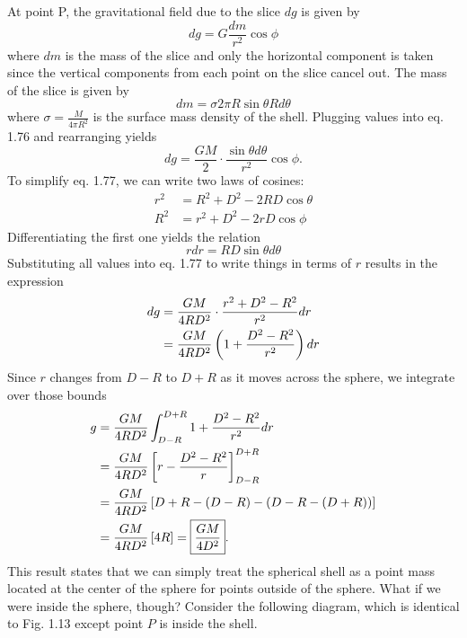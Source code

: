 \noindent At point P, the gravitational field due to the slice $dg$ is given by 
\begin{equation}
    dg = G\frac{dm}{r^2} \cos\phi
\end{equation}
\noindent where $dm$ is the mass of the slice and only the horizontal component is taken since the vertical components from each point on the slice cancel out. The mass of the slice is given by 
\begin{equation*}
    dm = \sigma 2\pi R\sin\theta Rd\theta
\end{equation*}
\noindent where $\sigma = \frac{M}{4\pi R^2}$ is the surface mass density of the shell. Plugging values into eq. 1.76 and rearranging yields
\begin{equation}
    dg = \frac{GM}{2}\cdot\frac{\sin\theta d\theta}{r^2}\cos\phi.
\end{equation}
\noindent To simplify eq. 1.77, we can write two laws of cosines:
\begin{align*}
    r^2 &= R^2 + D^2 - 2RD\cos\theta \\
    R^2 &= r^2 + D^2 - 2rD\cos\phi
\end{align*}
\noindent Differentiating the first one yields the relation
\begin{equation*}
    rdr = RD\sin\theta d\theta
\end{equation*}
\noindent Substituting all values into eq. 1.77 to write things in terms of $r$ results in the expression
\begin{align}
    dg &= \frac{GM}{4RD^2}\cdot\frac{r^2 + D^2 - R^2}{r^2} dr \nonumber \\
    &= \frac{GM}{4RD^2}\left(1 + \frac{D^2 - R^2}{r^2}\right)dr
\end{align}
\noindent Since $r$ changes from $D-R$ to $D+R$ as it moves across the sphere, we integrate over those bounds
\begin{align}
    g &= \frac{GM}{4RD^2}\int_{D-R}^{D+R} 1 + \frac{D^2 - R^2}{r^2}dr \nonumber \\
    &= \frac{GM}{4RD^2}\left[r - \frac{D^2 - R^2}{r}\right]_{D-R}^{D+R} \nonumber \\
    &= \frac{GM}{4RD^2}\left[D + R - (D - R) - (D - R - (D + R))\right] \nonumber \\
    &= \frac{GM}{4RD^2}\left[4R\right] = \boxed{\frac{GM}{4D^2}}.
\end{align}
\noindent This result states that we can simply treat the spherical shell as a point mass located at the center of the sphere for points outside of the sphere. What if we were inside the sphere, though? Consider the following diagram, which is identical to Fig. 1.13 except point $P$ is inside the shell.
